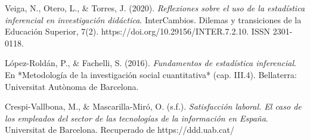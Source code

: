 \begin{thebibliography}{9}

  Veiga, N., Otero, L., \& Torres, J. (2020). \textit{Reflexiones sobre el uso de la estadística inferencial en investigación didáctica}. InterCambios. Dilemas y transiciones de la Educación Superior, 7(2). https://doi.org/10.29156/INTER.7.2.10. ISSN 2301-0118.

  
  López-Roldán, P., \& Fachelli, S. (2016). \textit{Fundamentos de estadística inferencial}. En *Metodología de la investigación social cuantitativa* (cap. III.4). Bellaterra: Universitat Autònoma de Barcelona.

  Crespi-Vallbona, M., \& Mascarilla-Miró, O. (s.f.). \textit{Satisfacción laboral. El caso de los empleados del sector de las tecnologías de la información en España}. Universitat de Barcelona. Recuperado de https://ddd.uab.cat/

\end{thebibliography}